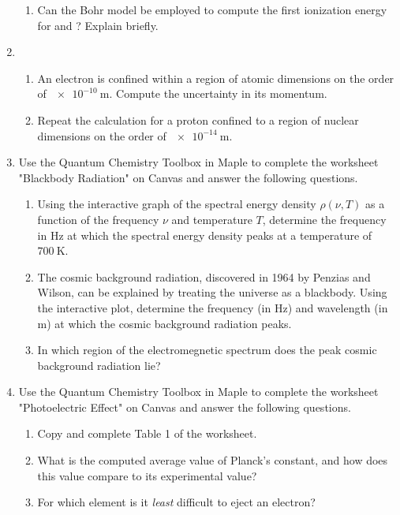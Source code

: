 \documentclass[../psets.tex]{subfiles}
\begin{document}
\begin{enumerate}
\begin{enumerate}
        \item Can the Bohr model be employed to compute the first ionization energy for  and ? Explain briefly.
    \end{enumerate}
    \item 
    \begin{enumerate}
        \item An electron is confined within a region of atomic dimensions on the order of $\SI{e-10}{\meter}$. Compute the uncertainty in its momentum.
        \item Repeat the calculation for a proton confined to a region of nuclear dimensions on the order of $\SI{e-14}{\meter}$.
    \end{enumerate}
    \item Use the Quantum Chemistry Toolbox in Maple to complete the worksheet "Blackbody Radiation" on Canvas and answer the following questions.
    \begin{enumerate}
        \item Using the interactive graph of the spectral energy density $\rho(\nu,T)$ as a function of the frequency $\nu$ and temperature $T$, determine the frequency in $\si{\hertz}$ at which the spectral energy density peaks at a temperature of $\SI{700}{\kelvin}$.
        \item The cosmic background radiation, discovered in 1964 by Penzias and Wilson, can be explained by treating the universe as a blackbody. Using the interactive plot, determine the frequency (in $\si{\hertz}$) and wavelength (in $\si{\meter}$) at which the cosmic background radiation peaks.
        \item In which region of the electromegnetic spectrum does the peak cosmic background radiation lie?
    \end{enumerate}
    \item Use the Quantum Chemistry Toolbox in Maple to complete the worksheet "Photoelectric Effect" on Canvas and answer the following questions.
    \begin{enumerate}
        \item Copy and complete Table 1 of the worksheet.
        \item What is the computed average value of Planck's constant, and how does this value compare to its experimental value?
        \item For which element is it \emph{least} difficult to eject an electron?
    \end{enumerate}
\end{enumerate}
\end{document}
